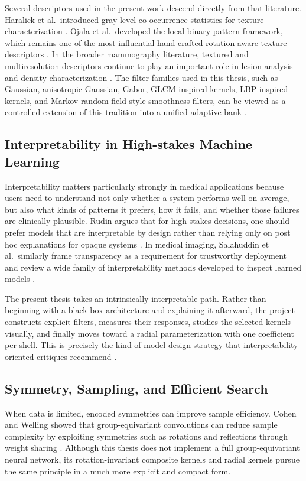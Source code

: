 \documentclass{cernatsnote}
\let\oldsubsection\subsection
\let\oldsubsubsection\subsubsection
\let\section\oldsubsection
\let\subsection\oldsubsubsection
\begin{document}
Several descriptors used in the present work descend directly from that literature. Haralick et al.\ introduced gray-level co-occurrence statistics for texture characterization \citep{haralick1973texture}. Ojala et al.\ developed the local binary pattern framework, which remains one of the most influential hand-crafted rotation-aware texture descriptors \citep{ojala2002lbp}. In the broader mammography literature, textured and multiresolution descriptors continue to play an important role in lesion analysis and density characterization \citep{gardezi2019mammographic}. The filter families used in this thesis, such as Gaussian, anisotropic Gaussian, Gabor, GLCM-inspired kernels, LBP-inspired kernels, and Markov random field style smoothness filters, can be viewed as a controlled extension of this tradition into a unified adaptive bank \citep{gabor1946theory}.

\section{Interpretability in High-stakes Machine Learning}
Interpretability matters particularly strongly in medical applications because users need to understand not only whether a system performs well on average, but also what kinds of patterns it prefers, how it fails, and whether those failures are clinically plausible. Rudin argues that for high-stakes decisions, one should prefer models that are interpretable by design rather than relying only on post hoc explanations for opaque systems \citep{rudin2019blackbox}. In medical imaging, Salahuddin et al.\ similarly frame transparency as a requirement for trustworthy deployment and review a wide family of interpretability methods developed to inspect learned models \citep{salahuddin2022transparency}.

The present thesis takes an intrinsically interpretable path. Rather than beginning with a black-box architecture and explaining it afterward, the project constructs explicit filters, measures their responses, studies the selected kernels visually, and finally moves toward a radial parameterization with one coefficient per shell. This is precisely the kind of model-design strategy that interpretability-oriented critiques recommend \citep{rudin2019blackbox}.

\section{Symmetry, Sampling, and Efficient Search}
When data is limited, encoded symmetries can improve sample efficiency. Cohen and Welling showed that group-equivariant convolutions can reduce sample complexity by exploiting symmetries such as rotations and reflections through weight sharing \citep{cohen2016gcnn}. Although this thesis does not implement a full group-equivariant neural network, its rotation-invariant composite kernels and radial kernels pursue the same principle in a much more explicit and compact form.
\end{document}
